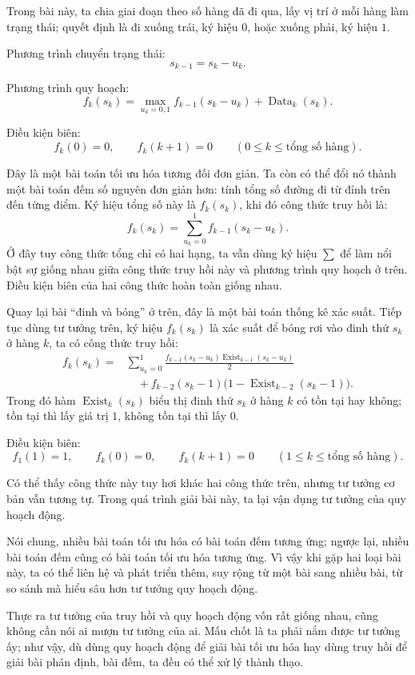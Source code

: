 \documentclass[11pt]{article}
\begin{document}
Trong bài này, ta chia giai đoạn theo số hàng đã đi qua, lấy vị trí ở mỗi
hàng làm trạng thái; quyết định là đi xuống trái, ký hiệu \(0\), hoặc xuống
phải, ký hiệu \(1\).

Phương trình chuyển trạng thái:
\[
  s_{k-1}=s_k-u_k.
\]

Phương trình quy hoạch:
\[
  f_k(s_k)=\max_{u_k=0,1} f_{k-1}(s_k-u_k)+\operatorname{Data}_k(s_k).
\]

Điều kiện biên:
\[
  f_k(0)=0,\qquad f_k(k+1)=0
  \qquad (0\le k\le \text{tổng số hàng}).
\]

Đây là một bài toán tối ưu hóa tương đối đơn giản. Ta còn có thể đổi nó
thành một bài toán đếm số nguyên đơn giản hơn: tính tổng số đường đi từ đỉnh
trên đến từng điểm. Ký hiệu tổng số này là \(f_k(s_k)\), khi đó công thức
truy hồi là:
\[
  f_k(s_k)=\sum_{u_k=0}^{1} f_{k-1}(s_k-u_k).
\]
Ở đây tuy công thức tổng chỉ có hai hạng, ta vẫn dùng ký hiệu \(\sum\) để làm
nổi bật sự giống nhau giữa công thức truy hồi này và phương trình quy hoạch ở
trên. Điều kiện biên của hai công thức hoàn toàn giống nhau.

Quay lại bài ``đinh và bóng'' ở trên, đây là một bài toán thống kê xác suất.
Tiếp tục dùng tư tưởng trên, ký hiệu \(f_k(s_k)\) là xác suất để bóng rơi vào
đinh thứ \(s_k\) ở hàng \(k\), ta có công thức truy hồi:
\[
\begin{aligned}
f_k(s_k)=&
\sum_{u_k=0}^{1}
\frac{f_{k-1}(s_k-u_k)\operatorname{Exist}_{k-1}(s_k-u_k)}{2}\\
&\quad+
f_{k-2}(s_k-1)\bigl(1-\operatorname{Exist}_{k-2}(s_k-1)\bigr).
\end{aligned}
\]
Trong đó hàm \(\operatorname{Exist}_k(s_k)\) biểu thị đinh thứ \(s_k\) ở
hàng \(k\) có tồn tại hay không; tồn tại thì lấy giá trị \(1\), không tồn tại
thì lấy \(0\).

Điều kiện biên:
\[
  f_1(1)=1,\qquad
  f_k(0)=0,\qquad f_k(k+1)=0
  \qquad (1\le k\le \text{tổng số hàng}).
\]

Có thể thấy công thức này tuy hơi khác hai công thức trên, nhưng tư tưởng cơ
bản vẫn tương tự. Trong quá trình giải bài này, ta lại vận dụng tư tưởng của
quy hoạch động.

Nói chung, nhiều bài toán tối ưu hóa có bài toán đếm tương ứng; ngược lại,
nhiều bài toán đếm cũng có bài toán tối ưu hóa tương ứng. Vì vậy khi gặp hai
loại bài này, ta có thể liên hệ và phát triển thêm, suy rộng từ một bài sang
nhiều bài, từ so sánh mà hiểu sâu hơn tư tưởng quy hoạch động.

Thực ra tư tưởng của truy hồi và quy hoạch động vốn rất giống nhau, cũng
không cần nói ai mượn tư tưởng của ai. Mấu chốt là ta phải nắm được tư tưởng
ấy; như vậy, dù dùng quy hoạch động để giải bài tối ưu hóa hay dùng truy hồi
để giải bài phán định, bài đếm, ta đều có thể xử lý thành thạo.
\end{document}
